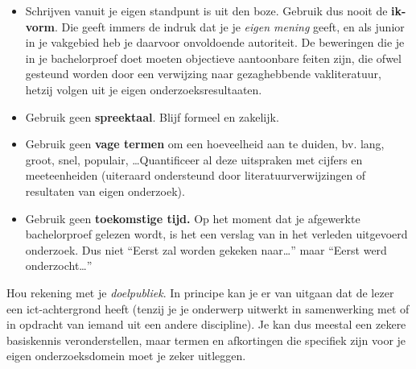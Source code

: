 \begin{itemize}
  \item Schrijven vanuit je eigen standpunt is uit den boze. Gebruik dus nooit de \textbf{ik-vorm}. Die geeft immers de indruk dat je je \emph{eigen mening} geeft, en als junior in je vakgebied heb je daarvoor onvoldoende autoriteit. De beweringen die je in je bachelorproef doet moeten objectieve aantoonbare feiten zijn, die ofwel gesteund worden door een verwijzing naar gezaghebbende vakliteratuur, hetzij volgen uit je eigen onderzoeksresultaaten.
  \item Gebruik geen \textbf{spreektaal}. Blijf formeel en zakelijk.
  \item Gebruik geen \textbf{vage termen} om een hoeveelheid aan te duiden, bv. lang, groot, snel, populair, \ldots Quantificeer al deze uitspraken met cijfers en meeteenheiden (uiteraard ondersteund door literatuurverwijzingen of resultaten van eigen onderzoek).
  \item Gebruik geen \textbf{toekomstige tijd.} Op het moment dat je afgewerkte bachelorproef gelezen wordt, is het een verslag van in het verleden uitgevoerd onderzoek. Dus niet ``Eerst zal worden gekeken naar\ldots'' maar ``Eerst werd onderzocht\ldots''
\end{itemize}



%

Hou rekening met je \emph{doelpubliek}. In principe kan je er van uitgaan dat de lezer een ict-achtergrond heeft (tenzij je je onderwerp uitwerkt in samenwerking met of in opdracht van iemand uit een andere discipline). Je kan dus meestal een zekere basiskennis veronderstellen, maar termen en afkortingen die specifiek zijn voor je eigen onderzoeksdomein moet je zeker uitleggen.

